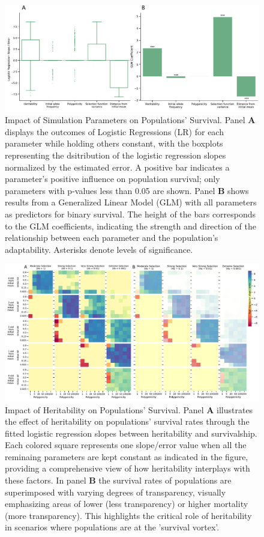 \documentclass{article}
\begin{document}
\begin{figure}[b]
    \centering
    \includegraphics[width=1\textwidth]{figures/glm_logisticreg.pdf}
    \caption{Impact of Simulation Parameters on Populations' Survival.  Panel \textbf{A} displays the outcomes of Logistic Regressions (LR) for each parameter while holding others constant, with the boxplots representing the dsitribution of the logistic regression slopes normalized by the estimated error. A positive bar indicates a parameter's positive influence on population survival; only parameters with p-values less than 0.05 are shown. Panel \textbf{B} shows results from a Generalized Linear Model (GLM) with all parameters as predictors for binary survival. The height of the bars corresponds to the GLM coefficients, indicating the strength and direction of the relationship between each parameter and the population's adaptability. Asterisks denote levels of significance.}
    \label{fig:glm_logisticreg}
\end{figure}

\begin{figure}[b]
    \centering
    \includegraphics[width=1\textwidth]{figures/h2_panel_figure_2plots.pdf}
    \caption{Impact of Heritability on Populations' Survival. Panel \textbf{A} illustrates the effect of heritability on populations' survival rates through the fitted logistic regression slopes between heritability and survivalship. Each colored square represents one slope/error value when all the reminaing parameters are kept constant as indicated in the figure, providing a comprehensive view of how heritability interplays with these factors. In panel \textbf{B} the survival rates of populations are superimposed with varying degrees of transparency, visually emphasizing areas of lower (less transparency) or higher mortality (more transparency). This highlights the critical role of heritability in scenarios where populations are at the 'survival vortex'.}
    \label{fig:h2_panel_figure}
\end{figure}
\end{document}
